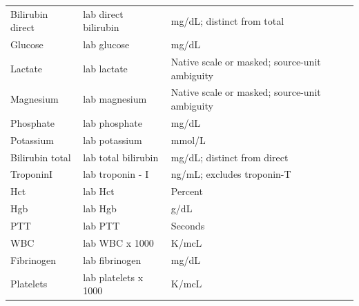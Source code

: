\begin{longtable}{p{.19\linewidth}p{.43\linewidth}p{.30\linewidth}}
Bilirubin direct & lab direct bilirubin & mg/dL; distinct from total \\
Glucose & lab glucose & mg/dL \\
Lactate & lab lactate & Native scale or masked; source-unit ambiguity \\
Magnesium & lab magnesium & Native scale or masked; source-unit ambiguity \\
Phosphate & lab phosphate & mg/dL \\
Potassium & lab potassium & mmol/L \\
Bilirubin total & lab total bilirubin & mg/dL; distinct from direct \\
TroponinI & lab troponin - I & ng/mL; excludes troponin-T \\
Hct & lab Hct & Percent \\
Hgb & lab Hgb & g/dL \\
PTT & lab PTT & Seconds \\
WBC & lab WBC x 1000 & K/mcL \\
Fibrinogen & lab fibrinogen & mg/dL \\
Platelets & lab platelets x 1000 & K/mcL \\
\end{longtable}
\normalsize
